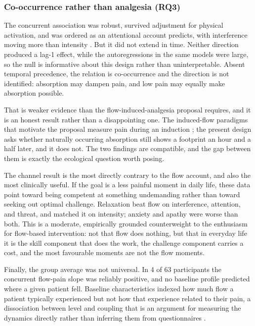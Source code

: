 \documentclass[11pt,a4paper]{article}
\begin{document}
\subsubsection{Co-occurrence rather than analgesia (RQ3)}
The concurrent association was robust, survived adjustment for physical activation, and was ordered
as an attentional account predicts, with interference moving more than intensity
\citep{eccleston1999pain,vandamme2010keeping}. But it did not extend in time. Neither direction
produced a lag-1 effect, while the autoregressions in the same models were large, so the null is
informative about this design rather than uninterpretable. Absent temporal precedence, the relation
is co-occurrence and the direction is not identified: absorption may dampen pain, and low pain may
equally make absorption possible.

That is weaker evidence than the flow-induced-analgesia proposal requires, and it is an honest
result rather than a disappointing one. The induced-flow paradigms that motivate the proposal
measure pain during an induction \citep{gromakovskis2025flow}; the present design asks whether
naturally occurring absorption still shows a footprint an hour and a half later, and it does not.
The two findings are compatible, and the gap between them is exactly the ecological question worth
posing.

The channel result is the most directly contrary to the flow account, and also the most
clinically useful. If the goal is a less painful moment in daily life, these data point toward being
competent at something undemanding rather than toward seeking out optimal challenge. Relaxation beat
flow on interference, attention, and threat, and matched it on intensity; anxiety and apathy were
worse than both. This is a moderate, empirically grounded counterweight to the enthusiasm for
flow-based intervention: not that flow does nothing, but that in everyday life it is the skill
component that does the work, the challenge component carries a cost, and the most favourable
moments are not the flow moments.

Finally, the group average was not universal. In 4 of 63 participants the concurrent flow-pain
slope was reliably positive, and no baseline profile predicted where a given patient fell.
Baseline characteristics indexed how much flow a patient typically experienced but not how that
experience related to their pain, a dissociation between level and coupling that is an argument for
measuring the dynamics directly rather than inferring them from questionnaires
\citep{wright2020personalized,fisher2018lack,molenaar2004manifesto}.
\end{document}
